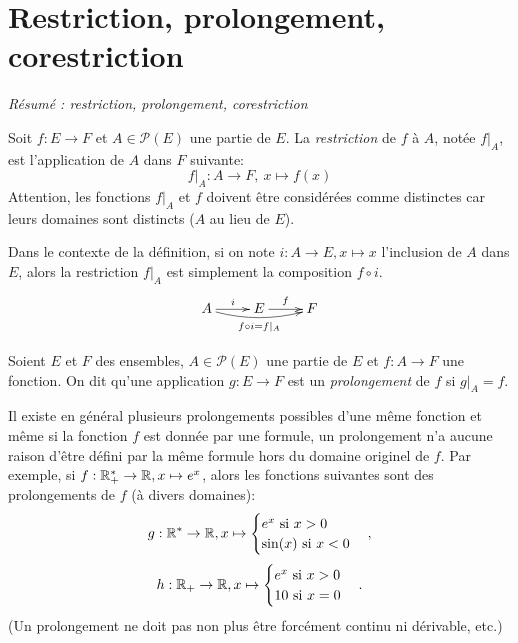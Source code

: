 


\section{Restriction, prolongement, corestriction}

\emph{Résumé : restriction, prolongement, corestriction}

\begin{definition}[Restriction]
Soit $f : E\to F$ et $A \in \mathcal P(E)$ une partie de $E$. La \emph{restriction} de $f$ à $A$, notée $f|_{A}$, est l'application de $A$ dans $F$ suivante:
\[
f|_{A} : A\to F, \: x\mapsto f(x)
\]
Attention, les fonctions $f|_A$ et $f$ doivent être considérées comme distinctes car leurs domaines sont distincts ($A$ au lieu de $E$).
\end{definition}

\begin{remarque}
Dans le contexte de la définition, si on note $i : A\to E, x\mapsto x$ l'inclusion de $A$ dans $E$, alors la restriction $f|_A$ est simplement la composition $f\circ i$.
\[\xymatrix{
A \ar[r]^{i} \ar@/_/[rr]_{f\circ i = f|_A} & E \ar[r]^f & F
}\]
\end{remarque}

\begin{definition}[Prolongement]
Soient $E$ et $F$ des ensembles, $A\in \mathcal P(E)$ une partie de $E$ et $f : A\to F$ une fonction. On dit qu'une application $g : E\to F$ est un \emph{prolongement} de $f$ si $g|_A = f$.
\end{definition}

\begin{attention}
Il existe en général plusieurs prolongements possibles d'une même fonction et même si la fonction $f$ est donnée par une formule, un prolongement n'a aucune raison d'être défini par la même formule hors du domaine originel de $f$. Par exemple, si $f : \mathbb{R}_+^* \to \mathbb{R}, x\mapsto e^x$, alors les fonctions suivantes  sont des prolongements de $f$ (à divers domaines):
\[g : \mathbb{R}^* \to \mathbb{R}, x\mapsto \begin{cases}e^x\text{ si } x>0\\ \sin(x) \text{ si } x<0\end{cases},\]
\[h : \mathbb{R}_+ \to \mathbb{R}, x\mapsto \begin{cases}e^x\text{ si } x>0\\ 10 \text{ si }x=0\end{cases}.\]
(Un prolongement ne doit pas non plus être forcément continu ni dérivable, etc.)
\end{attention}


